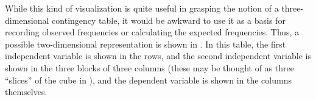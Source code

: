 While this kind of visualization is quite useful in grasping the notion of a three\hyp{}dimensional contingency  table, it would be awkward to use it as a basis for recording observed frequencies  or calculating the expected  frequencies. Thus, a possible two\hyp{}dimensional representation is shown in .  In this table, the first independent variable is shown in the rows, and the second independent variable is shown in the three blocks of three columns (these may be thought of as three ``slices'' of the cube in ), and the dependent variable is shown in the columns themselves.

\begin{table}
\caption{A two\hyp{}dimensional representation of a three\hyp{}dimensional contingency table}
\label{tab:cfaschematictable}
\end{table}


